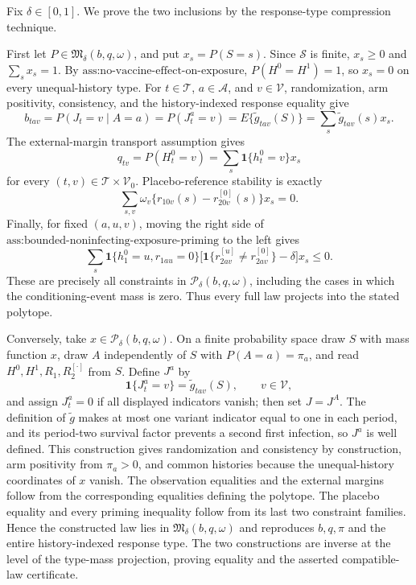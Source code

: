 Fix \(\delta\in[0,1]\).  We prove the two inclusions by the response-type compression technique.

First let \(P\in\mathfrak M_\delta(b,q,\omega)\), and put \(x_s=P(S=s)\).  Since \(\mathcal S\) is finite, \(x_s\geq0\) and \(\sum_sx_s=1\).  By \(\text{ass:no-vaccine-effect-on-exposure}\), \(P(H^0=H^1)=1\), so \(x_s=0\) on every unequal-history type.  For \(t\in\mathcal T\), \(a\in\mathcal A\), and \(v\in\mathcal V\), randomization, arm positivity, consistency, and the history-indexed response equality give
\[
b_{tav}=P(J_t=v\mid A=a)=P(J_t^a=v)=E\{\widetilde g_{tav}(S)\}=\sum_s\widetilde g_{tav}(s)x_s.
\]
The external-margin transport assumption gives
\[
q_{tv}=P(H_t^0=v)=\sum_s\mathbf 1\{h_t^0=v\}x_s
\]
for every \((t,v)\in\mathcal T\times\mathcal V_0\).  Placebo-reference stability is exactly
\[
\sum_{s,v}\omega_v\{r_{10v}(s)-r^{[0]}_{20v}(s)\}x_s=0.
\]
Finally, for fixed \((a,u,v)\), moving the right side of \(\text{ass:bounded-noninfecting-exposure-priming}\) to the left gives
\[
\sum_s\mathbf 1\{h_1^0=u,r_{1au}=0\}
 \bigl[\mathbf 1\{r^{[u]}_{2av}\ne r^{[0]}_{2av}\}-\delta\bigr]x_s\leq0.
\]
These are precisely all constraints in \(\mathcal P_\delta(b,q,\omega)\), including the cases in which the conditioning-event mass is zero.  Thus every full law projects into the stated polytope.

Conversely, take \(x\in\mathcal P_\delta(b,q,\omega)\).  On a finite probability space draw \(S\) with mass function \(x\), draw \(A\) independently of \(S\) with \(P(A=a)=\pi_a\), and read \(H^0,H^1,R_1,R_2^{[\cdot]}\) from \(S\).  Define \(J^a\) by
\[
\mathbf 1\{J_t^a=v\}=\widetilde g_{tav}(S),\qquad v\in\mathcal V,
\]
and assign \(J_t^a=0\) if all displayed indicators vanish; then set \(J=J^A\).  The definition of \(\widetilde g\) makes at most one variant indicator equal to one in each period, and its period-two survival factor prevents a second first infection, so \(J^a\) is well defined.  This construction gives randomization and consistency by construction, arm positivity from \(\pi_a>0\), and common histories because the unequal-history coordinates of \(x\) vanish.  The observation equalities and the external margins follow from the corresponding equalities defining the polytope.  The placebo equality and every priming inequality follow from its last two constraint families.  Hence the constructed law lies in \(\mathfrak M_\delta(b,q,\omega)\) and reproduces \(b,q,\pi\) and the entire history-indexed response type.  The two constructions are inverse at the level of the type-mass projection, proving equality and the asserted compatible-law certificate.

